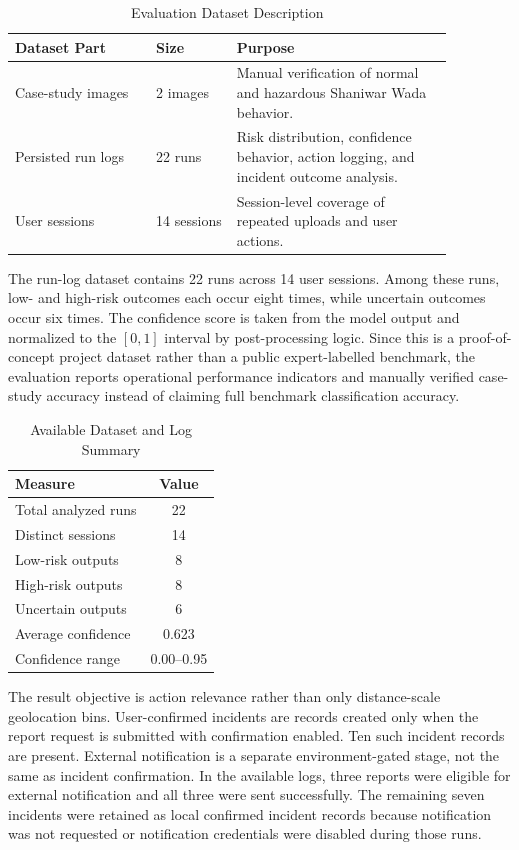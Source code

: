 \documentclass[12pt,a4paper]{article}
\begin{document}
\begin{table}[h]
\caption{Evaluation Dataset Description}
\centering
\begin{tabular}{p{0.28\linewidth}p{0.16\linewidth}p{0.43\linewidth}}
\toprule
\textbf{Dataset Part} & \textbf{Size} & \textbf{Purpose} \\
\midrule
Case-study images & 2 images & Manual verification of normal and hazardous Shaniwar Wada behavior. \\
Persisted run logs & 22 runs & Risk distribution, confidence behavior, action logging, and incident outcome analysis. \\
User sessions & 14 sessions & Session-level coverage of repeated uploads and user actions. \\
\bottomrule
\end{tabular}
\end{table}

The run-log dataset contains 22 runs across 14 user sessions. Among these runs, low- and high-risk outcomes each occur eight times, while uncertain outcomes occur six times. The confidence score is taken from the model output and normalized to the $[0,1]$ interval by post-processing logic. Since this is a proof-of-concept project dataset rather than a public expert-labelled benchmark, the evaluation reports operational performance indicators and manually verified case-study accuracy instead of claiming full benchmark classification accuracy.

\begin{table}[h]
\caption{Available Dataset and Log Summary}
\centering
\begin{tabular}{lc}
\toprule
\textbf{Measure} & \textbf{Value} \\
\midrule
Total analyzed runs & 22 \\
Distinct sessions & 14 \\
Low-risk outputs & 8 \\
High-risk outputs & 8 \\
Uncertain outputs & 6 \\
Average confidence & 0.623 \\
Confidence range & 0.00--0.95 \\
\bottomrule
\end{tabular}
\end{table}

The result objective is action relevance rather than only distance-scale geolocation bins. User-confirmed incidents are records created only when the report request is submitted with confirmation enabled. Ten such incident records are present. External notification is a separate environment-gated stage, not the same as incident confirmation. In the available logs, three reports were eligible for external notification and all three were sent successfully. The remaining seven incidents were retained as local confirmed incident records because notification was not requested or notification credentials were disabled during those runs.
\end{document}
